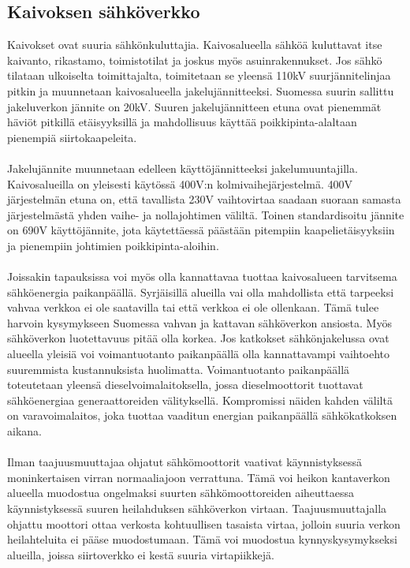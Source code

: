 \documentclass[finnish,12pt,a4paper,pdftex,elec,utf8]{aaltothesis}
\begin{document}
\subsection{Kaivoksen sähköverkko}
Kaivokset ovat suuria sähkönkuluttajia. Kaivosalueella sähköä kuluttavat itse kaivanto, rikastamo, toimistotilat ja joskus myös asuinrakennukset. Jos sähkö tilataan ulkoiselta toimittajalta, toimitetaan se yleensä 110kV suurjännitelinjaa pitkin ja muunnetaan kaivosalueella jakelujännitteeksi. Suomessa suurin sallittu jakeluverkon jännite on 20kV. Suuren jakelujännitteen etuna ovat pienemmät häviöt pitkillä etäisyyksillä ja mahdollisuus käyttää poikkipinta-alaltaan pienempiä siirtokaapeleita. \cite[s. 251-253]{Hakapää}
\\\\
Jakelujännite muunnetaan edelleen käyttöjännitteeksi jakelumuuntajilla. Kaivosalueilla on yleisesti käytössä 400V:n kolmivaihejärjestelmä. 400V järjestelmän etuna on, että tavallista 230V vaihtovirtaa saadaan suoraan samasta järjestelmästä yhden vaihe- ja nollajohtimen väliltä. Toinen standardisoitu jännite on 690V käyttöjännite, jota käytettäessä päästään pitempiin kaapelietäisyyksiin ja pienempiin johtimien poikkipinta-aloihin. \cite[s. 251-253]{Hakapää}
\\\\
Joissakin tapauksissa voi myös olla kannattavaa tuottaa kaivosalueen tarvitsema sähköenergia paikanpäällä. Syrjäisillä alueilla vai olla mahdollista että tarpeeksi vahvaa verkkoa ei ole saatavilla tai että verkkoa ei ole ollenkaan. Tämä tulee harvoin kysymykseen Suomessa vahvan ja kattavan sähköverkon ansiosta. Myös sähköverkon luotettavuus pitää olla korkea. Jos katkokset sähkönjakelussa ovat alueella yleisiä voi voimantuotanto paikanpäällä olla kannattavampi vaihtoehto suuremmista kustannuksista huolimatta. Voimantuotanto paikanpäällä toteutetaan yleensä dieselvoimalaitoksella, jossa dieselmoottorit tuottavat sähköenergiaa generaattoreiden välityksellä. Kompromissi näiden kahden väliltä on varavoimalaitos, joka tuottaa vaaditun energian paikanpäällä sähkökatkoksen aikana. \cite[s. 251-253]{Hakapää}
\\\\
Ilman taajuusmuuttajaa ohjatut sähkömoottorit vaativat käynnistyksessä moninkertaisen virran normaaliajoon verrattuna. Tämä voi heikon kantaverkon alueella muodostua ongelmaksi suurten sähkömoottoreiden aiheuttaessa käynnistyksessä suuren heilahduksen sähköverkon virtaan. Taajuusmuuttajalla ohjattu moottori ottaa verkosta kohtuullisen tasaista virtaa, jolloin suuria verkon heilahteluita ei pääse muodostumaan. Tämä voi muodostua kynnyskysymykseksi alueilla, joissa siirtoverkko ei kestä suuria virtapiikkejä. \cite{MyyntiHaastattelu}
\end{document}

